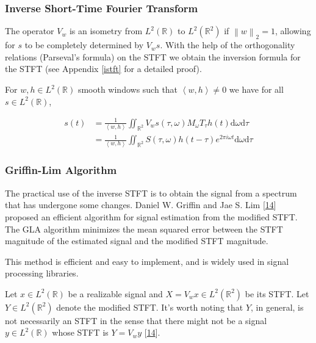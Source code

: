 \documentclass[
  american,
]{article}
\begin{document}
\hypertarget{inverse-short-time-fourier-transform}{%
\subsubsection{Inverse Short-Time Fourier Transform}\label{inverse-short-time-fourier-transform}}

The operator \(V_w\) is an isometry from \(L^2(\mathbb{R})\) to \(L^2(\mathbb{R}^2)\)
if \(\left\lVert w\right\rVert_2=1\),
allowing for \(s\) to be completely determined by \(V_w s\).
With the help of the orthogonality relations (Parseval's formula) on the STFT we obtain
the inversion formula for the STFT (see Appendix \ref{istft} for a detailed proof).

For \(w,h\in L^2(\mathbb{R})\) smooth windows such that \(\left\langle w,h\right\rangle\neq 0\)
we have for all \(s\in L^2(\mathbb{R})\),

\begin{align}
s(t) &=\frac{1}{\left\langle w,h\right\rangle} \iint_{\mathbb{R}^2}V_w s(\tau,\omega)M_\omega T_\tau h(t) \mathrm{d}\omega\mathrm{d}\tau\\
     &= \frac{1}{\left\langle w,h\right\rangle}
        \iint_{\mathbb{R}^2} S(\tau,\omega) h(t-\tau) e^{2\pi i\omega t} \mathrm{d}\omega\mathrm{d}\tau
\end{align}

\hypertarget{griffin-lim-algorithm}{%
\subsubsection{Griffin-Lim Algorithm}\label{griffin-lim-algorithm}}

The practical use of the inverse STFT is to obtain the signal
from a spectrum that has undergone some changes.
Daniel W. Griffin and Jae S. Lim {[}\protect\hyperlink{ref-griffin1983}{14}{]} proposed
an efficient algorithm for signal estimation from the modified STFT.
The GLA algorithm minimizes the mean squared error between the STFT magnitude
of the estimated signal and the modified STFT magnitude.

This method is efficient and easy to implement, and is widely
used in signal processing libraries.

Let \(x\in L^2(\mathbb{R})\) be a realizable signal and \(X=V_w x\in L^2(\mathbb{R}^2)\)
be its STFT. Let \(Y\in L^2(\mathbb{R}^2)\) denote the modified STFT.
It's worth noting that \(Y\), in general, is not necessarily an STFT
in the sense that there might not be a signal \(y\in L^2(\mathbb{R})\)
whose STFT is \(Y=V_w y\) {[}\protect\hyperlink{ref-griffin1983}{14}{]}.
\end{document}
